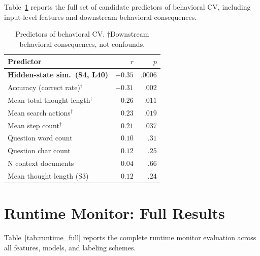 \documentclass{article}
\begin{document}
Table~\ref{tab:baselines_full} reports the full set of candidate predictors of behavioral CV, including input-level features and downstream behavioral consequences.

\begin{table}[ht]
\caption{Predictors of behavioral CV. $\dagger$Downstream behavioral consequences, not confounds.}
\label{tab:baselines_full}
\centering
\small
\begin{tabular}{lrr}
\toprule
Predictor & $r$ & $p$ \\
\midrule
\textbf{Hidden-state sim.\ (S4, L40)} & $\mathbf{-0.35}$ & $\mathbf{.0006}$ \\
\midrule
Accuracy (correct rate)$^\dagger$ & $-0.31$ & $.002$ \\
Mean total thought length$^\dagger$ & $0.26$ & $.011$ \\
Mean search actions$^\dagger$ & $0.23$ & $.019$ \\
Mean step count$^\dagger$ & $0.21$ & $.037$ \\
\midrule
Question word count & $0.10$ & $.31$ \\
Question char count & $0.12$ & $.25$ \\
N context documents & $0.04$ & $.66$ \\
Mean thought length (S3) & $0.12$ & $.24$ \\
\bottomrule
\end{tabular}
\end{table}

\section{Runtime Monitor: Full Results}
\label{app:runtime}

Table~\ref{tab:runtime_full} reports the complete runtime monitor evaluation across all features, models, and labeling schemes.
\end{document}
